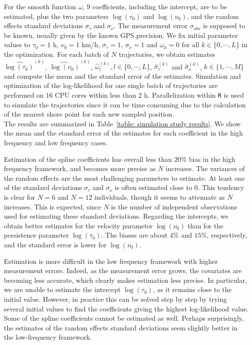 \documentclass[aoas]{imsart}
\theoremstyle{definition}
\theoremstyle{remark}
\theoremstyle{remark}
\newcommand {\1}{\mathbb{1}}
\begin{document}
For the smooth function $\omega$, $9$ coefficients, including the intercept, are to be estimated, plus the two parameters $\log(\tau_0)$ and $\log(\nu_0)$, and the random effects standard deviations $\sigma_{\tau}$ and $\sigma_{\nu}$. The measurement error $\sigma_{obs}$ is supposed to be known, usually given by the known GPS precision.  
We fix initial parameter values to $\tau_{0}=1$ h, $\nu_{0} = 1$ km/h, $\sigma_{\tau}=1$, $\sigma_{\nu}=1$ and $\omega_k=0$ for all $k \in \{0,\cdots,L\}$ in the optimization. 
For each batch of $N$ trajectories, we obtain estimates $\widehat{\log(\tau_{0})}^{(k)}$, $\widehat{\log(\nu_{0})}^{(k)}$, $\hat{\omega}_l^{(k)}, l \in \{0,\cdots, L\}$, $\hat{\sigma}_{\tau}^{(k)}$ and $\hat{\sigma}_{\nu}^{(k)}$, $k \in \{1,\cdots,M\}$ and compute the mean  and the standard error of the estimates. Simulation and optimization of the log-likelihood for one single batch of trajectories are performed on $16$ CPU cores within less than $2$ h. Parallelization within \texttt{R} is used to simulate the trajectories since it can be time consuming due to the calculation of the nearest shore point for each new sampled position. \\

The results are summarized in Table~\ref{table: simulation study results}. We show the mean and the standard error of the estimates for each coefficient in the high frequency and low frequency cases.

Estimation of the spline coefficients has overall less than $20 \%$ bias in the high frequency framework, and becomes more precise as $N$ increases. The variances of the random effects are the most challenging parameters to estimate. At least one of the standard deviations $\sigma_{\tau}$ and $\sigma_{\nu}$ is often estimated close to $0$. This tendency is clear for $N=6$ and $N=12$ individuals, though it seems to attenuate as $N$ increases. This is expected, since $N$ is the number of independent observations used for estimating these standard deviations. 
Regarding the intercepts, we obtain better estimates for the velocity parameter $\log(\nu_0)$ than for the persistence parameter $\log(\tau_0)$. The biases are about $4 \%$ and $15\%$, respectively,  and the standard error is lower for $\log(\nu_0)$.

Estimation is more difficult in the low frequency framework with higher measurement errors. Indeed, as the measurement error grows, the covariates are becoming less accurate, which clearly makes estimation less precise. In particular, we are unable to estimate the intercept $\log(\tau_0)$, as it remains close to the initial value. However, in practice this can be solved step by step by trying several initial values to find the coefficients giving the highest log-likelihood value. Some of the spline coefficients cannot be estimated as well. Perhaps surprisingly, the estimates of the random effects standard deviations seem slightly better in the low-frequency framework.\\
\end{document}
